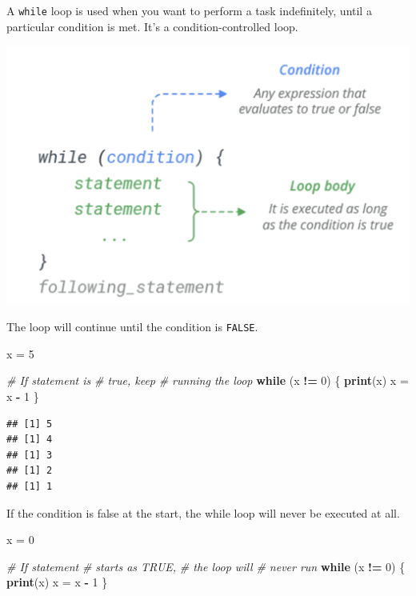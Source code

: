 \documentclass[
]{book}
\newenvironment{Shaded}{\begin{snugshade}}{\end{snugshade}}
\newcommand{\CommentTok}[1]{\textcolor[rgb]{0.56,0.35,0.01}{\textit{#1}}}
\newcommand{\ControlFlowTok}[1]{\textcolor[rgb]{0.13,0.29,0.53}{\textbf{#1}}}
\newcommand{\DecValTok}[1]{\textcolor[rgb]{0.00,0.00,0.81}{#1}}
\newcommand{\KeywordTok}[1]{\textcolor[rgb]{0.13,0.29,0.53}{\textbf{#1}}}
\newcommand{\NormalTok}[1]{#1}
\newcommand{\OperatorTok}[1]{\textcolor[rgb]{0.81,0.36,0.00}{\textbf{#1}}}
\newcommand{\StringTok}[1]{\textcolor[rgb]{0.31,0.60,0.02}{#1}}
\begin{document}
A \texttt{while} loop is used when you want to perform a task indefinitely, until a particular condition is met. It's a condition-controlled loop.

\begin{center}\includegraphics[width=14.5in]{images/WhileLoop} \end{center}

The loop will continue until the condition is \texttt{FALSE}.

\begin{Shaded}
\begin{Highlighting}[]
\NormalTok{x =}\StringTok{ }\DecValTok{5}

\CommentTok{# If statement is}
\CommentTok{# true, keep}
\CommentTok{# running the loop}
\ControlFlowTok{while}\NormalTok{ (x }\OperatorTok{!=}\StringTok{ }\DecValTok{0}\NormalTok{) \{}
    \KeywordTok{print}\NormalTok{(x)}
\NormalTok{    x =}\StringTok{ }\NormalTok{x }\OperatorTok{-}\StringTok{ }\DecValTok{1}
\NormalTok{\}}
\end{Highlighting}
\end{Shaded}

\begin{verbatim}
## [1] 5
## [1] 4
## [1] 3
## [1] 2
## [1] 1
\end{verbatim}

If the condition is false at the start, the while loop will never be executed at all.

\begin{Shaded}
\begin{Highlighting}[]
\NormalTok{x =}\StringTok{ }\DecValTok{0}

\CommentTok{# If statement}
\CommentTok{# starts as TRUE,}
\CommentTok{# the loop will}
\CommentTok{# never run}
\ControlFlowTok{while}\NormalTok{ (x }\OperatorTok{!=}\StringTok{ }\DecValTok{0}\NormalTok{) \{}
    \KeywordTok{print}\NormalTok{(x)}
\NormalTok{    x =}\StringTok{ }\NormalTok{x }\OperatorTok{-}\StringTok{ }\DecValTok{1}
\NormalTok{\}}
\end{Highlighting}
\end{Shaded}
\end{document}
